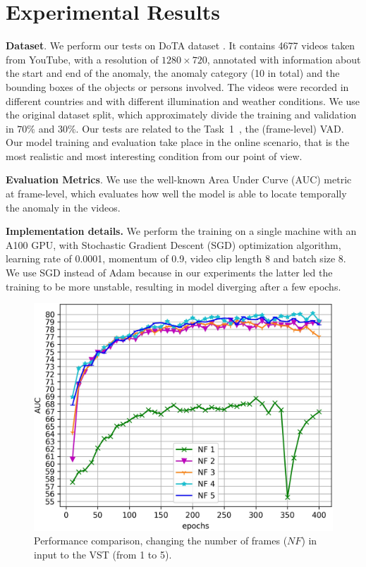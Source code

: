 \section{Experimental Results}
\label{sec:experiments}


\noindent\textbf{Dataset}.
We perform our tests on DoTA dataset \cite{9712446}.
It contains 4677 videos taken from YouTube, with a resolution of $1280 \times 720$, annotated with information about the start and end of the anomaly, the anomaly category (10 in total) and the bounding boxes of the objects or persons involved.
The videos were recorded in different countries and with different illumination and weather conditions.
We use the original dataset split, which approximately divide the training and validation in $70\%$ and $30\%$.
Our tests are related to the Task~1~\cite{9712446}, the (frame-level) VAD.
Our model training and evaluation take place in the online scenario, that is the most realistic and most interesting condition from our point of view.

\noindent\textbf{Evaluation Metrics}.
We use the well-known Area Under Curve (AUC) metric at frame-level, which evaluates how well the model is able to locate temporally the anomaly in the videos.

\noindent\textbf{Implementation details.}
We perform the training on a single machine with an A100 GPU\@, with Stochastic Gradient Descent (SGD) optimization algorithm, learning rate of 0.0001, momentum of 0.9, video clip length 8 and batch size 8.
We use SGD instead of Adam because in our experiments the latter led the training to be more unstable, resulting in model diverging after a few epochs.

\newcommand{\figsize}{0.7\columnwidth}

\begin{figure}[ht!]
\centerline{\includegraphics[clip,width=\figsize]{images/exp_1.jpg}}
	\caption{Performance comparison, changing the number of frames ($\mathit{NF}$) in input to the VST (from 1 to 5).}
	\label{fig:num-frames-vst}
\end{figure}


